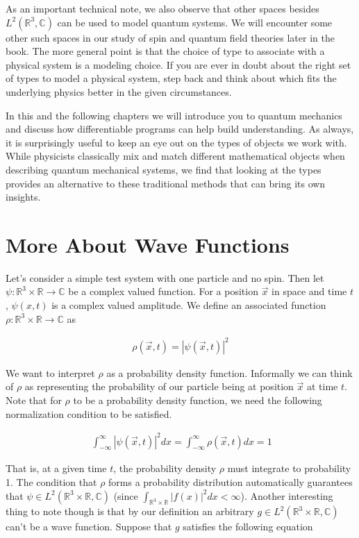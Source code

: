 \documentclass[book.tex]{subfiles}
\begin{document}
As an important technical note, we also observe that other spaces besides $L^2(\mathbb{R}^3, \mathbb{C})$ can be used to model quantum systems. We will encounter some other such spaces in our study of spin and quantum field theories later in the book. The more general point is that the choice of type to associate with a physical system is a modeling choice. If you are ever in doubt about the right set of types to model a physical system, step back and think about which fits the underlying physics better in the given circumstances.

In this and the following chapters we will introduce you to quantum mechanics and discuss how differentiable programs can help build understanding. As always, it is surprisingly useful to keep an eye out on the types of objects we work with. While physicists classically mix and match different mathematical objects when describing quantum mechanical systems, we find that looking at the types provides an alternative to these traditional methods that can bring its own insights.

\section{More About Wave Functions}

Let's consider a simple test system with one particle and no spin. Then let $\psi: \mathbb{R}^3 \times \mathbb{R} \to \mathbb{C}$ be a complex valued function. For a position $\vec{x}$ in space and time $t$, $\psi(x, t)$ is a complex valued amplitude. We define an associated function $\rho: \mathbb{R}^3 \times \mathbb{R} \to \mathbb{C}$ as

\begin{align}
    \rho(\vec{x}, t) = |\psi(\vec{x}, t)|^2
\end{align}

We want to interpret $\rho$ as a probability density function. Informally we can think of $\rho$ as representing the probability of our particle being at position $\vec{x}$ at time $t$. Note that for $\rho$ to be a probability density function, we need the following normalization condition to be satisfied.

\begin{align}\
\int_{-\infty}^{\infty} |\psi(\vec{x}, t)|^2 dx = \int_{-\infty}^{\infty} \rho(\vec{x}, t) dx = 1
\end{align}

That is, at a given time $t$, the probability density $\rho$ must integrate to probability 1. The condition that $\rho$ forms a probability distribution automatically guarantees that $\psi \in L^2(\mathbb{R}^3 \times \mathbb{R}, \mathbb{C})$ (since $\int_{\mathbb{R}^3 \times \mathbb{R}} |f(x)|^2 dx < \infty$). Another interesting thing to note though is that by our definition an arbitrary $g \in L^2(\mathbb{R}^3 \times \mathbb{R}, \mathbb{C})$ can't be a wave function. Suppose that $g$ satisfies the following equation
\end{document}
